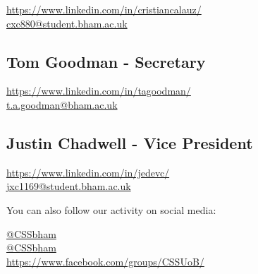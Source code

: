 \documentclass{article}
\begin{document}
\faLinkedin \hspace{0.1cm} \url{https://www.linkedin.com/in/cristiancalauz/} \\
\faEnvelope \hspace{0.1cm} \href{mailto:cxc880@student.bham.ac.uk}{cxc880@student.bham.ac.uk}

\subsection*{Tom Goodman - Secretary}

\faLinkedin \hspace{0.1cm} \url{https://www.linkedin.com/in/tagoodman/} \\
\faEnvelope \hspace{0.1cm} \href{mailto:t.a.goodman@bham.ac.uk}{t.a.goodman@bham.ac.uk}

\subsection*{Justin Chadwell - Vice President}

\faLinkedin \hspace{0.1cm} \url{https://www.linkedin.com/in/jedevc/} \\
\faEnvelope \hspace{0.1cm} \href{mailto:jxc1169@student.bham.ac.uk}{jxc1169@student.bham.ac.uk}

\vspace{1cm}

\noindent You can also follow our activity on social media:
\medskip

\noindent \faTwitter  \hspace{0.1cm} \href{https://twitter.com/cssbham}{@CSSbham} \\
\faInstagram  \hspace{0.1cm} \href{https://www.instagram.com/cssbham/}{@CSSbham} \\
\faFacebook  \hspace{0.3cm} \url{https://www.facebook.com/groups/CSSUoB/}
\end{document}
